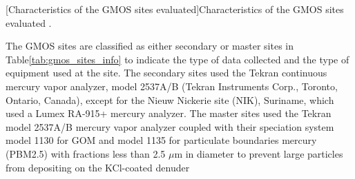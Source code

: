  \begin{table}[H]
[Characteristics of the GMOS sites evaluated]{Characteristics of the GMOS sites evaluated \cite{koenig_seasonal_2021,sprovieri_atmospheric_2016}. }
\label{tab:gmos_sites_info}

\centering
{}

\end{table}

  
 \begin{flushleft}
  The GMOS sites are classified as either secondary or master sites in Table\ref{tab:gmos_sites_info} to indicate the type of data collected and the type of equipment used at the site. The secondary sites used the Tekran continuous mercury vapor analyzer, model 2537A/B (Tekran Instruments Corp., Toronto, Ontario, Canada), except for the Nieuw Nickerie site (NIK), Suriname, which used a Lumex RA-915+ mercury analyzer. The master sites used the Tekran model 2537A/B mercury vapor analyzer coupled with their speciation system model 1130 for GOM and model 1135 for particulate boundaries mercury (PBM2.5) with fractions less than 2.5 $\mu$m in diameter to prevent large particles from depositing on the KCl-coated denuder \cite{koenig_seasonal_2021,sprovieri_atmospheric_2016,gustin_measuring_2015}
\end{flushleft}


